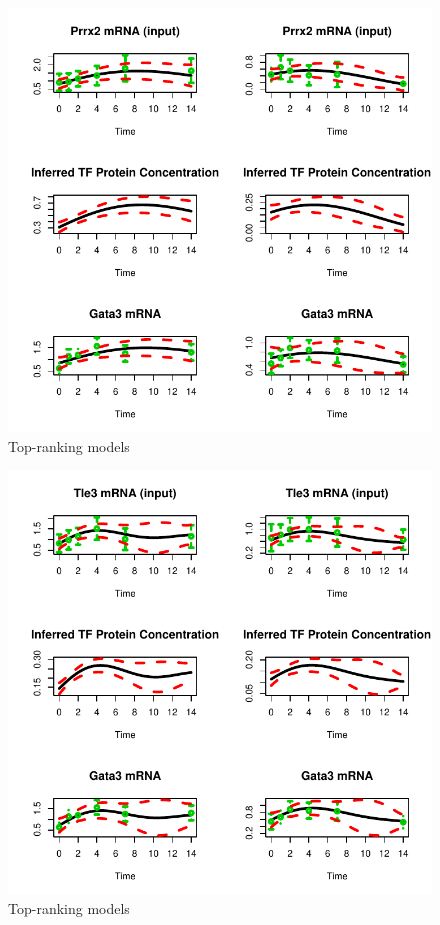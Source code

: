 \documentclass{article}
\begin{document}
\begin{figure}[htb]
  \centering
  \includegraphics[width=\columnwidth]{gpdisim_Prrx2_Gata3}
  \caption{Top-ranking models}
  \label{fig:model1}
\end{figure}

\begin{figure}[htb]
  \centering
  \includegraphics[width=\columnwidth]{gpdisim_Tle3_Gata3}
  \caption{Top-ranking models}
  \label{fig:model2}
\end{figure}
\end{document}
